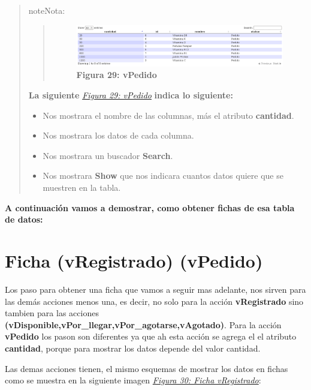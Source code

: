 \documentclass[letterpaper,11pt,spanish]{sphinxmanual}
\begin{document}
\begin{quote}
\begin{notice}{note}{Nota:}
\begin{quote}
\begin{figure}[htbp]
\includegraphics{json1.png}
\caption{\textbf{Figura 29: vPedido}}\label{_templates/Contenido6/Parte5:figura44}\end{figure}
\end{quote}

\textbf{La siguiente} {\hyperref[_templates/Contenido6/Parte5:figura44]{\emph{Figura 29: vPedido}}} \textbf{indica lo siguiente:}
\begin{itemize}
\item {} 
Nos mostrara el nombre de las columnas, más el atributo \textbf{cantidad}.

\item {} 
Nos mostrara los datos de cada columna.

\item {} 
Nos mostrara un buscador \textbf{Search}.

\item {} 
Nos mostrara \textbf{Show} que nos indicara
cuantos datos quiere que se muestren en la tabla.

\end{itemize}
\end{notice}
\end{quote}

\textbf{A continuación vamos a demostrar, como obtener fichas de esa tabla de datos:}


\section{Ficha (vRegistrado) (vPedido)}
\label{_templates/Contenido6/Parte5:ficha-vregistrado-vpedido}
Los paso para obtener una ficha que vamos a seguir mas adelante, nos sirven para las demás acciones menos una, es decir, no solo para la acción \textbf{vRegistrado} sino tambien para las acciones \textbf{(vDisponible,vPor\_llegar,vPor\_agotarse,vAgotado)}. Para la acción \textbf{vPedido} los pason son diferentes ya que ah esta acción se agrega el el atributo \textbf{cantidad}, porque para mostrar los datos depende del valor cantidad.

Las demas acciones tienen, el mismo esquemas de mostrar los datos en fichas como se muestra en la siguiente imagen {\hyperref[_templates/Contenido6/Parte5:figura45]{\emph{Figura 30: Ficha vRegistrado}}}:
\end{document}
